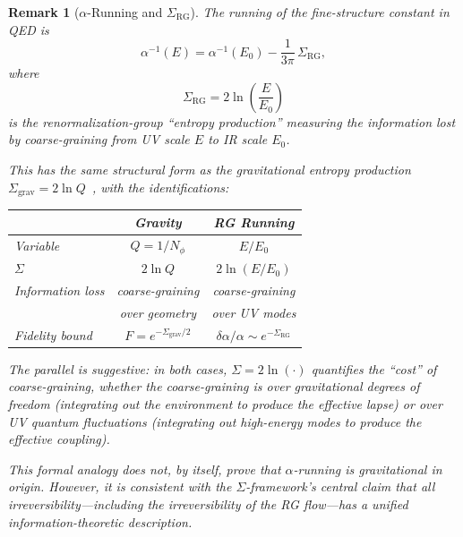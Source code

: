 \documentclass[letterpaper,twocolumn,superscriptaddress,longbibliography]{revtex4-2}
\newtheorem*{remark}{Remark}
\newcommand{\Sgrav}{\Sigma_{\mathrm{grav}}}
\begin{document}
\begin{remark}[$\alpha$-Running and $\Sigma_{\mathrm{RG}}$]
\label{rem:alpha_running}
The running of the fine-structure constant in QED is
\begin{equation}
  \alpha^{-1}(E)
  = \alpha^{-1}(E_0) - \frac{1}{3\pi}\,\Sigma_{\mathrm{RG}},
  \label{eq:alpha_running}
\end{equation}
where
\begin{equation}
  \Sigma_{\mathrm{RG}} = 2\ln\!\left(\frac{E}{E_0}\right)
  \label{eq:Sigma_RG}
\end{equation}
is the renormalization-group ``entropy production'' measuring
the information lost by coarse-graining from UV scale $E$ to
IR scale $E_0$.

This has the same structural form as the gravitational
entropy production $\Sgrav = 2\ln Q$~\cite{PaperII}, with
the identifications:
\begin{center}
\begin{tabular}{lcc}
\toprule
 & \textbf{Gravity} & \textbf{RG Running} \\
\midrule
Variable & $Q = 1/N_\phi$ & $E/E_0$ \\
$\Sigma$ & $2\ln Q$ & $2\ln(E/E_0)$ \\
Information loss & coarse-graining & coarse-graining \\
 & over geometry & over UV modes \\
Fidelity bound & $F = e^{-\Sgrav/2}$ &
  $\delta\alpha/\alpha \sim e^{-\Sigma_{\mathrm{RG}}}$ \\
\bottomrule
\end{tabular}
\end{center}
The parallel is suggestive: in both cases, $\Sigma = 2\ln(\cdot)$
quantifies the ``cost'' of coarse-graining, whether the
coarse-graining is over gravitational degrees of freedom
(integrating out the environment to produce the effective
lapse) or over UV quantum fluctuations (integrating out
high-energy modes to produce the effective coupling).

This formal analogy does not, by itself, prove that
$\alpha$-running is gravitational in origin.  However, it
is consistent with the $\Sigma$-framework's central claim
that all irreversibility---including the irreversibility
of the RG flow---has a unified information-theoretic
description.
\end{remark}


\end{document}
